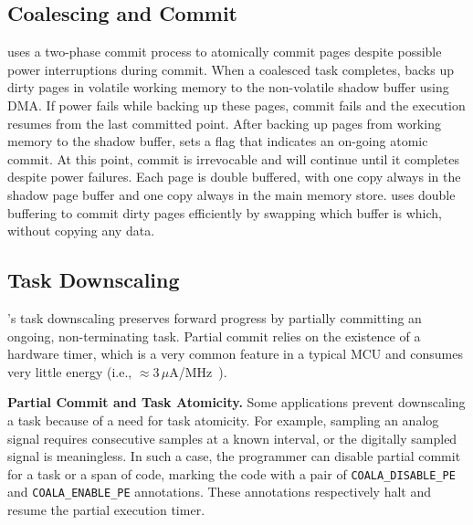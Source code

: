 
\subsection{Coalescing and Commit}


\sys uses a two-phase commit process to atomically commit pages despite
possible power interruptions during commit.  When a coalesced task completes,
\sys backs up dirty pages in volatile working memory to the non-volatile
shadow buffer using DMA. 
%
If power fails while backing up these pages, commit fails and the execution
resumes from the last committed point.  After backing up pages from working
memory to the shadow buffer, \sys sets a flag that indicates an on-going atomic
commit.  At this point, commit is irrevocable and will continue until it
completes despite power failures.   
%
Each page is double buffered, with one copy always in the shadow page buffer
and one copy always in the main memory store.  \sys uses double buffering to
commit dirty pages efficiently by swapping which buffer is which, without
copying any data.
%

\subsection{Task Downscaling}

\sys's task downscaling preserves forward progress by partially committing an
ongoing, non-terminating task. 
%
Partial commit relies on the existence of a hardware timer, which is a very
common feature in a typical MCU and consumes very little energy (i.e.,
$\approx$3\,$\mu$A/MHz~\cite{msp430datasheet}).  

 \textbf{Partial Commit and Task Atomicity.} Some applications prevent
downscaling a task because of a need for task atomicity.  For example, sampling
an analog signal requires consecutive samples at a known interval, or the
digitally sampled signal is meaningless.  In such a case, the programmer can
disable partial commit for a task or a span of code, marking  the code with a
pair of \texttt{COALA\_DISABLE\_PE} and \texttt{COALA\_ENABLE\_PE} annotations.
These annotations respectively halt and resume the partial execution timer.


